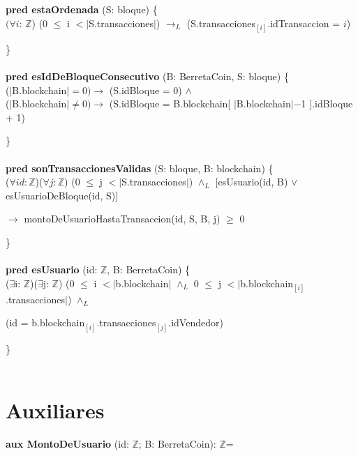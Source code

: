 \documentclass{article}
\newcommand{\Entero}{$\mathds{Z}$}
\begin{document}
    \indent\indent\textbf{pred estaOrdenada} (S: bloque) \{\\
        \indent\indent\indent $(\forall i$: \Entero) (0 $\le$ i $< |$S.transacciones$|$) $\rightarrow_{L}$ (S.transacciones$_{[i]}$.idTransaccion = $i$)

    \indent\indent\}\\\\

    \indent\indent\textbf{pred esIdDeBloqueConsecutivo} (B: BerretaCoin, S: bloque) \{\\
        \indent\indent\indent ($|$B.blockchain$| = 0)\rightarrow$ (S.idBloque = 0) $\land$\\
        \indent\indent\indent ($|$B.blockchain$| \ne 0) \rightarrow$ (S.idBloque = B.blockchain[ $|$B.blockchain$|-$1 ].idBloque + 1)

    \indent\indent\}\\\\

    \indent\indent\textbf{pred sonTransaccionesValidas} (S: bloque, B: blockchain) \{\\
        \indent\indent\indent ($\forall id:$\Entero)($\forall j:$\Entero) (0 $\le$ j $<|$S.transacciones$|$) $\land_{L}$ [esUsuario(id, B) $\lor$ esUsuarioDeBloque(id, S)]
        
        \indent\indent\indent\indent\indent\indent\indent\indent $\rightarrow$ montoDeUsuarioHastaTransaccion(id, S, B, j) $\ge$ 0

    \indent\indent\}\\\\

    \indent\indent\textbf{pred esUsuario} (id: \Entero, B: BerretaCoin) \{\\
        \indent\indent\indent($\exists$i: \Entero)($\exists$j: \Entero) (0 $\leq$ i $< |$b.blockchain$|$ $\land_{L}$ 0 $\le$ j $< |$b.blockchain$_{[i]}$.transacciones$|$) $\land_{L}$

        \indent\indent\indent(id = b.blockchain$_{[i]}$.transacciones$_{[j]}$.idVendedor)

    \indent\indent\}\\\\

\newpage
\section*{Auxiliares}

    \textbf{aux MontoDeUsuario} (id: \Entero; B: BerretaCoin): \Entero =\\
\end{document}
